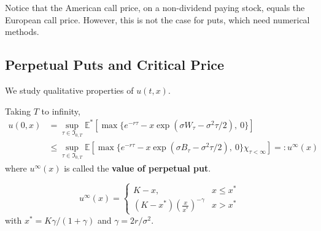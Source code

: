Notice that the American call price, on a non-dividend paying stock, equals the European call price. However, this is not the case for puts, which need numerical methods. 

\subsection{Perpetual Puts and Critical Price}

We study qualitative properties of $u(t,x)$.

Taking $T$ to infinity,
\begin{equation*}
    \begin{aligned}
        u(0, x) &= \sup_{\tau \in \mathfrak{I}_{0, T}} \mathbb{E}^\ast [\max \{ e^{-r \tau} -x \exp(\sigma W_\tau - \sigma^2 \tau/2), ~0 \}] \\
        &\le \sup_{\tau \in \mathfrak{I}_{0, T}} \mathbb{E} [\max \{ e^{-r \tau} -x \exp(\sigma B_\tau - \sigma^2 \tau/2), ~0 \} \chi_{\tau < \infty}] =: u^\infty(x)
    \end{aligned}
\end{equation*}
where $u^\infty(x)$ is called the \textbf{value of perpetual put}. 

\begin{proposition}
    \begin{equation}\label{eq:202305131550}
        u^\infty(x) = \begin{cases}
            K-x, & x \le x^\ast \\
            (K-x^\ast)\left(\frac{x}{x^\ast}\right)^{- \gamma} & x > x^\ast 
        \end{cases}
    \end{equation}
    with $x^\ast = K \gamma / (1+ \gamma)$ and $\gamma = 2r/\sigma^2$.
\end{proposition}

